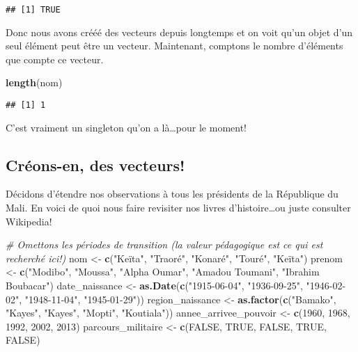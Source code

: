 \documentclass[]{book}
\newenvironment{Shaded}{\begin{snugshade}}{\end{snugshade}}
\newcommand{\KeywordTok}[1]{\textcolor[rgb]{0.13,0.29,0.53}{\textbf{#1}}}
\newcommand{\DecValTok}[1]{\textcolor[rgb]{0.00,0.00,0.81}{#1}}
\newcommand{\StringTok}[1]{\textcolor[rgb]{0.31,0.60,0.02}{#1}}
\newcommand{\CommentTok}[1]{\textcolor[rgb]{0.56,0.35,0.01}{\textit{#1}}}
\newcommand{\OtherTok}[1]{\textcolor[rgb]{0.56,0.35,0.01}{#1}}
\newcommand{\NormalTok}[1]{#1}
\begin{document}
\begin{verbatim}
## [1] TRUE
\end{verbatim}

Donc nous avons crééé des vecteurs depuis longtemps et on voit qu'un
objet d'un seul élément peut être un vecteur. Maintenant, comptons le
nombre d'éléments que compte ce vecteur.

\begin{Shaded}
\begin{Highlighting}[]
\KeywordTok{length}\NormalTok{(nom)}
\end{Highlighting}
\end{Shaded}

\begin{verbatim}
## [1] 1
\end{verbatim}

C'est vraiment un singleton qu'on a là\ldots{}pour le moment!

\subsection{Créons-en, des vecteurs!}\label{creons-en-des-vecteurs}

Décidons d'étendre nos observations à tous les présidents de la
République du Mali. En voici de quoi nous faire revisiter nos livres
d'histoire\ldots{}ou juste consulter Wikipedia!

\begin{Shaded}
\begin{Highlighting}[]
\CommentTok{# Omettons les périodes de transition (la valeur pédagogique est ce qui est recherché ici!)}
\NormalTok{nom <-}\StringTok{ }\KeywordTok{c}\NormalTok{(}\StringTok{"Keïta"}\NormalTok{, }\StringTok{"Traoré"}\NormalTok{, }\StringTok{"Konaré"}\NormalTok{, }\StringTok{"Touré"}\NormalTok{, }\StringTok{"Keïta"}\NormalTok{)}
\NormalTok{prenom <-}\StringTok{ }\KeywordTok{c}\NormalTok{(}\StringTok{"Modibo"}\NormalTok{, }\StringTok{"Moussa"}\NormalTok{, }\StringTok{"Alpha Oumar"}\NormalTok{, }\StringTok{"Amadou Toumani"}\NormalTok{, }\StringTok{"Ibrahim Boubacar"}\NormalTok{)}
\NormalTok{date_naissance <-}\StringTok{ }\KeywordTok{as.Date}\NormalTok{(}\KeywordTok{c}\NormalTok{(}\StringTok{"1915-06-04"}\NormalTok{, }\StringTok{"1936-09-25"}\NormalTok{, }\StringTok{"1946-02-02"}\NormalTok{, }\StringTok{"1948-11-04"}\NormalTok{, }\StringTok{"1945-01-29"}\NormalTok{))}
\NormalTok{region_naissance <-}\StringTok{ }\KeywordTok{as.factor}\NormalTok{(}\KeywordTok{c}\NormalTok{(}\StringTok{"Bamako"}\NormalTok{, }\StringTok{"Kayes"}\NormalTok{, }\StringTok{"Kayes"}\NormalTok{, }\StringTok{"Mopti"}\NormalTok{, }\StringTok{"Koutiala"}\NormalTok{))}
\NormalTok{annee_arrivee_pouvoir <-}\StringTok{ }\KeywordTok{c}\NormalTok{(}\DecValTok{1960}\NormalTok{, }\DecValTok{1968}\NormalTok{, }\DecValTok{1992}\NormalTok{, }\DecValTok{2002}\NormalTok{, }\DecValTok{2013}\NormalTok{)}
\NormalTok{parcours_militaire <-}\StringTok{ }\KeywordTok{c}\NormalTok{(}\OtherTok{FALSE}\NormalTok{, }\OtherTok{TRUE}\NormalTok{, }\OtherTok{FALSE}\NormalTok{, }\OtherTok{TRUE}\NormalTok{, }\OtherTok{FALSE}\NormalTok{)}
\end{Highlighting}
\end{Shaded}
\end{document}
